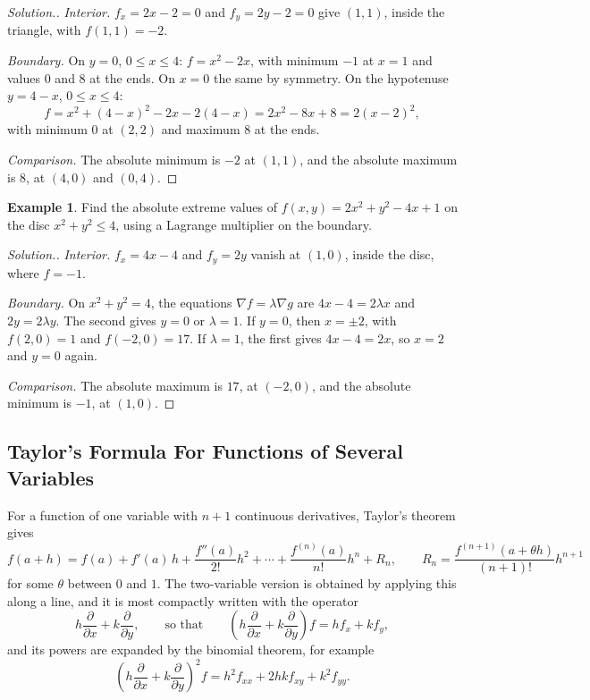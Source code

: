 \documentclass[11pt,a4paper]{article}
\theoremstyle{definition}
\newtheorem{exa}[thm]{Example}
\newenvironment{solution}
  {\renewcommand{\qedsymbol}{}\begin{proof}[\textit{Solution}.]}
  {\end{proof}}
\begin{document}
\begin{solution}
\emph{Interior.} $f_x = 2x - 2 = 0$ and $f_y = 2y - 2 = 0$ give $(1,1)$, inside the
triangle, with $f(1,1) = -2$.

\emph{Boundary.} On $y = 0$, $0\leq x\leq 4$: $f = x^2 - 2x$, with minimum $-1$ at
$x = 1$ and values $0$ and $8$ at the ends. On $x = 0$ the same by symmetry. On
the hypotenuse $y = 4 - x$, $0\leq x\leq 4$:
\[f = x^2 + (4-x)^2 - 2x - 2(4-x) = 2x^2 - 8x + 8 = 2(x-2)^2,\]
with minimum $0$ at $(2,2)$ and maximum $8$ at the ends.

\emph{Comparison.} The absolute minimum is $-2$ at $(1,1)$, and the absolute
maximum is $8$, at $(4,0)$ and $(0,4)$.
\end{solution}

\begin{exa}
\label{ex:discboundary}
Find the absolute extreme values of $f(x,y) = 2x^2 + y^2 - 4x + 1$ on the disc
$x^2 + y^2\leq 4$, using a Lagrange multiplier on the boundary.
\end{exa}

\begin{solution}
\emph{Interior.} $f_x = 4x - 4$ and $f_y = 2y$ vanish at $(1,0)$, inside the disc,
where $f = -1$.

\emph{Boundary.} On $x^2 + y^2 = 4$, the equations $\nabla f = \lambda\nabla g$
are $4x - 4 = 2\lambda x$ and $2y = 2\lambda y$. The second gives $y = 0$ or
$\lambda = 1$. If $y = 0$, then $x = \pm 2$, with $f(2,0) = 1$ and
$f(-2,0) = 17$. If $\lambda = 1$, the first gives $4x - 4 = 2x$, so $x = 2$ and
$y = 0$ again.

\emph{Comparison.} The absolute maximum is $17$, at $(-2,0)$, and the absolute
minimum is $-1$, at $(1,0)$.
\end{solution}


{\color[wave]{485}\subsection{Taylor's Formula For Functions of Several Variables}}

For a function of one variable with $n+1$ continuous derivatives, Taylor's
theorem gives
\[f(a+h) = f(a) + f'(a)\,h + \frac{f''(a)}{2!}h^2 + \cdots + \frac{f^{(n)}(a)}{n!}h^n
+ R_n,\qquad R_n = \frac{f^{(n+1)}(a+\theta h)}{(n+1)!}h^{n+1}\]
for some $\theta$ between $0$ and $1$. The two-variable version is obtained by
applying this along a line, and it is most compactly written with the operator
\[h\frac{\partial}{\partial x} + k\frac{\partial}{\partial y},\qquad\text{so that}
\qquad \left(h\frac{\partial}{\partial x} + k\frac{\partial}{\partial y}\right)f =
hf_x + kf_y ,\]
and its powers are expanded by the binomial theorem, for example
\[\left(h\frac{\partial}{\partial x} + k\frac{\partial}{\partial y}\right)^2f =
h^2f_{xx} + 2hkf_{xy} + k^2f_{yy} .\]
\end{document}
